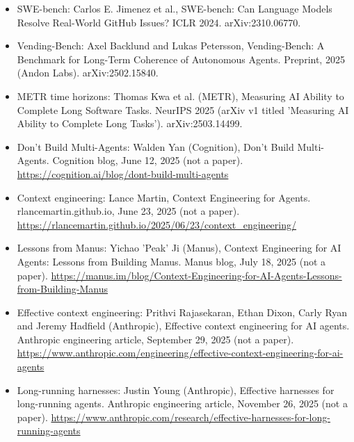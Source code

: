 \begin{itemize}[leftmargin=*]
\item SWE-bench: Carlos E. Jimenez et al., SWE-bench: Can Language Models Resolve Real-World GitHub Issues? ICLR 2024. arXiv:2310.06770.
\item Vending-Bench: Axel Backlund and Lukas Petersson, Vending-Bench: A Benchmark for Long-Term Coherence of Autonomous Agents. Preprint, 2025 (Andon Labs). arXiv:2502.15840.
\item METR time horizons: Thomas Kwa et al. (METR), Measuring AI Ability to Complete Long Software Tasks. NeurIPS 2025 (arXiv v1 titled 'Measuring AI Ability to Complete Long Tasks'). arXiv:2503.14499.
\item Don't Build Multi-Agents: Walden Yan (Cognition), Don't Build Multi-Agents. Cognition blog, June 12, 2025 (not a paper). \url{https://cognition.ai/blog/dont-build-multi-agents}
\item Context engineering: Lance Martin, Context Engineering for Agents. rlancemartin.github.io, June 23, 2025 (not a paper). \url{https://rlancemartin.github.io/2025/06/23/context_engineering/}
\item Lessons from Manus: Yichao 'Peak' Ji (Manus), Context Engineering for AI Agents: Lessons from Building Manus. Manus blog, July 18, 2025 (not a paper). \url{https://manus.im/blog/Context-Engineering-for-AI-Agents-Lessons-from-Building-Manus}
\item Effective context engineering: Prithvi Rajasekaran, Ethan Dixon, Carly Ryan and Jeremy Hadfield (Anthropic), Effective context engineering for AI agents. Anthropic engineering article, September 29, 2025 (not a paper). \url{https://www.anthropic.com/engineering/effective-context-engineering-for-ai-agents}
\item Long-running harnesses: Justin Young (Anthropic), Effective harnesses for long-running agents. Anthropic engineering article, November 26, 2025 (not a paper). \url{https://www.anthropic.com/research/effective-harnesses-for-long-running-agents}
\end{itemize}
